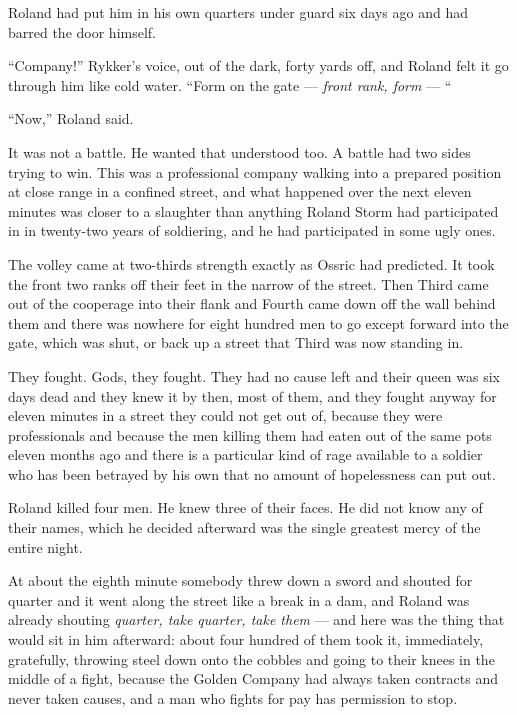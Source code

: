 Roland had put him in his own quarters under guard six days ago and had barred the door himself.

“Company!” Rykker’s voice, out of the dark, forty yards off, and Roland felt it go through him like cold water. “Form on the gate — \textit{front rank, form} — “

“Now,” Roland said.

\sceneBreak

It was not a battle. He wanted that understood too. A battle had two sides trying to win. This was a professional company walking into a prepared position at close range in a confined street, and what happened over the next eleven minutes was closer to a slaughter than anything Roland Storm had participated in in twenty-two years of soldiering, and he had participated in some ugly ones.

The volley came at two-thirds strength exactly as Ossric had predicted. It took the front two ranks off their feet in the narrow of the street. Then Third came out of the cooperage into their flank and Fourth came down off the wall behind them and there was nowhere for eight hundred men to go except forward into the gate, which was shut, or back up a street that Third was now standing in.

They fought. Gods, they fought. They had no cause left and their queen was six days dead and they knew it by then, most of them, and they fought anyway for eleven minutes in a street they could not get out of, because they were professionals and because the men killing them had eaten out of the same pots eleven months ago and there is a particular kind of rage available to a soldier who has been betrayed by his own that no amount of hopelessness can put out.

Roland killed four men. He knew three of their faces. He did not know any of their names, which he decided afterward was the single greatest mercy of the entire night.

At about the eighth minute somebody threw down a sword and shouted for quarter and it went along the street like a break in a dam, and Roland was already shouting \textit{quarter, take quarter, take them} — and here was the thing that would sit in him afterward: about four hundred of them took it, immediately, gratefully, throwing steel down onto the cobbles and going to their knees in the middle of a fight, because the Golden Company had always taken contracts and never taken causes, and a man who fights for pay has permission to stop.

